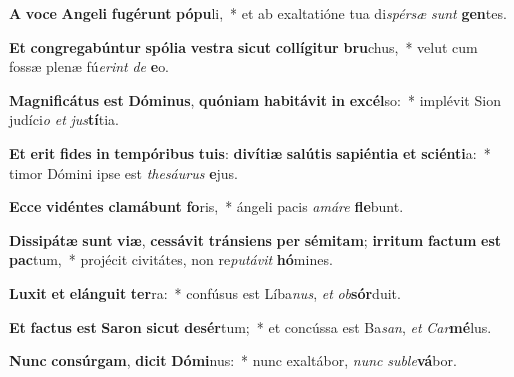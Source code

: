 \item \textbf{A} \textbf{vo}\textbf{ce} \textbf{An}\textbf{ge}\textbf{li} \textbf{fu}\textbf{gé}\textbf{runt} \textbf{pó}\textbf{pu}li,~* et ab exaltatióne tua di\textit{spér}\textit{sæ} \textit{sunt} \textbf{gen}tes.
\item \textbf{Et} \textbf{con}\textbf{gre}\textbf{ga}\textbf{bún}\textbf{tur} \textbf{spó}\textbf{li}\textbf{a} \textbf{ves}\textbf{tra} \textbf{sic}\textbf{ut} \textbf{col}\textbf{lí}\textbf{gi}\textbf{tur} \textbf{bru}chus,~* velut cum fossæ plenæ fú\textit{e}\textit{rint} \textit{de} \textbf{e}o.
\item \textbf{Ma}\textbf{gni}\textbf{fi}\textbf{cá}\textbf{tus} \textbf{est} \textbf{Dó}\textbf{mi}\textbf{nus}, \textbf{quón}\textbf{i}\textbf{am} \textbf{ha}\textbf{bi}\textbf{tá}\textbf{vit} \textbf{in} \textbf{ex}\textbf{cél}so:~* implévit Sion judíci\textit{o} \textit{et} \textit{jus}\textbf{tí}tia.
\item \textbf{Et} \textbf{e}\textbf{rit} \textbf{fi}\textbf{des} \textbf{in} \textbf{tem}\textbf{pó}\textbf{ri}\textbf{bus} \textbf{tu}\textbf{is}: \textbf{di}\textbf{ví}\textbf{ti}\textbf{æ} \textbf{sa}\textbf{lú}\textbf{tis} \textbf{sa}\textbf{pi}\textbf{én}\textbf{ti}\textbf{a} \textbf{et} \textbf{sci}\textbf{én}\textbf{ti}a:~* timor Dómini ipse est \textit{the}\textit{sáu}\textit{rus} \textbf{e}jus.
\item \textbf{Ec}\textbf{ce} \textbf{vi}\textbf{dén}\textbf{tes} \textbf{cla}\textbf{má}\textbf{bunt} \textbf{fo}ris,~* ángeli pacis \textit{a}\textit{má}\textit{re} \textbf{fle}bunt.
\item \textbf{Dis}\textbf{si}\textbf{pá}\textbf{tæ} \textbf{sunt} \textbf{vi}\textbf{æ}, \textbf{ces}\textbf{sá}\textbf{vit} \textbf{tráns}\textbf{i}\textbf{ens} \textbf{per} \textbf{sé}\textbf{mi}\textbf{tam}; \textbf{ir}\textbf{ri}\textbf{tum} \textbf{fac}\textbf{tum} \textbf{est} \textbf{pac}tum,~* projécit civitátes, non re\textit{pu}\textit{tá}\textit{vit} \textbf{hó}mines.
\item \textbf{Lu}\textbf{xit} \textbf{et} \textbf{e}\textbf{lán}\textbf{gu}\textbf{it} \textbf{ter}ra:~* confúsus est Líba\textit{nus}, \textit{et} \textit{ob}\textbf{sór}duit.
\item \textbf{Et} \textbf{fac}\textbf{tus} \textbf{est} \textbf{Sa}\textbf{ron} \textbf{sic}\textbf{ut} \textbf{de}\textbf{sér}tum;~* et concússa est Ba\textit{san}, \textit{et} \textit{Car}\textbf{mé}lus.
\item \textbf{Nunc} \textbf{con}\textbf{súr}\textbf{gam}, \textbf{di}\textbf{cit} \textbf{Dó}\textbf{mi}nus:~* nunc exaltábor, \textit{nunc} \textit{sub}\textit{le}\textbf{vá}bor.
